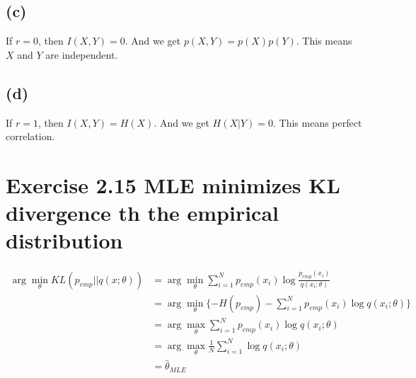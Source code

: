 \documentclass{jsarticle}
\begin{document}
\subsection*{(c)}
If $r=0$, then $I(X,Y)=0$.
And we get $p(X,Y)=p(X)p(Y)$.
This means $X$ and $Y$ are independent.
\subsection*{(d)}
If $r=1$, then $I(X,Y)=H(X)$.
And we get $H(X|Y)=0$.
This means perfect correlation.

\section*{Exercise 2.15 MLE minimizes KL divergence th the empirical distribution}
\begin{align}
\arg \min_\theta KL(p_{emp}||q(x;\theta)) & = \arg \min_\theta \sum_{i=1}^{N}p_{emp}(x_i)\log \frac{p_{emp}(x_i)}{q(x_i;\theta)}\\
& =  \arg \min_\theta \{-H(p_{emp})-\sum_{i=1}^{N}p_{emp}(x_i)\log q(x_i;\theta) \}\\
& = \arg \max_\theta \sum_{i=1}^{N}p_{emp}(x_i)\log q(x_i;\theta)\\
& = \arg \max_\theta \frac{1}{N}\sum_{i=1}^{N}\log q(x_i;\theta)\\
& = \hat{\theta}_{MLE}
\end{align}
\end{document}
